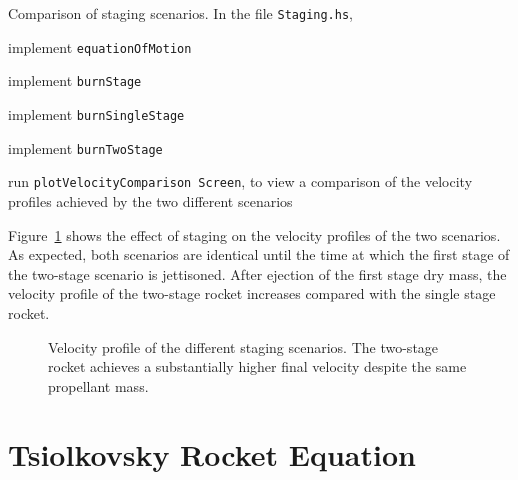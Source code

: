 \documentclass[12pt,openany]{book}
\newcommand{\filename}[1]{\texttt{#1}}  %
\newcommand{\code}[1]{\texttt{#1}}      %
\begin{document}
\begin{problem}[label=staging]{Comparison of staging scenarios.}
  In the file \filename{Staging.hs},
  \begin{probitemize}
  \item implement \code{equationOfMotion}
  \item implement \code{burnStage}
  \item implement \code{burnSingleStage}
  \item implement \code{burnTwoStage}
  \item run \code{plotVelocityComparison Screen}, to view a comparison of the velocity profiles achieved by the two different scenarios
  \end{probitemize}
\end{problem}

Figure~\ref{fig:staging-velocity-comparison} shows the effect of staging on the velocity profiles of the two scenarios. As expected, both scenarios are identical until the time at which the first stage of the two-stage scenario is jettisoned. After ejection of the first stage dry mass, the velocity profile of the two-stage rocket increases compared with the single stage rocket.

\begin{figure}[htbp]
  \resizebox{\textwidth}{!}{}
  \caption{Velocity profile of the different staging scenarios. The two-stage rocket achieves a substantially higher final velocity despite the same propellant mass.}
  \label{fig:staging-velocity-comparison}
\end{figure}

\section{Tsiolkovsky Rocket Equation}
\label{sec:tsiolkovsky}
\end{document}
